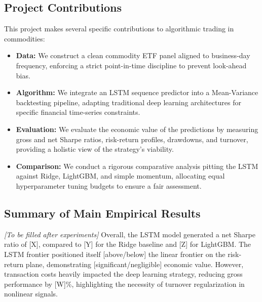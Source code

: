 \documentclass[a4paper,oneside]{scrbook}
\begin{document}
\subsection{Project Contributions}
This project makes several specific contributions to algorithmic trading in commodities:
\begin{itemize}
    \item \textbf{Data:} We construct a clean commodity ETF panel aligned to business-day frequency, enforcing a strict point-in-time discipline to prevent look-ahead bias.
    \item \textbf{Algorithm:} We integrate an LSTM sequence predictor into a Mean-Variance backtesting pipeline, adapting traditional deep learning architectures for specific financial time-series constraints.
    \item \textbf{Evaluation:} We evaluate the economic value of the predictions by measuring gross and net Sharpe ratios, risk-return profiles, drawdowns, and turnover, providing a holistic view of the strategy's viability.
    \item \textbf{Comparison:} We conduct a rigorous comparative analysis pitting the LSTM against Ridge, LightGBM, and simple momentum, allocating equal hyperparameter tuning budgets to ensure a fair assessment.
\end{itemize}

\subsection{Summary of Main Empirical Results}
\textit{[To be filled after experiments]} 
Overall, the LSTM model generated a net Sharpe ratio of [X], compared to [Y] for the Ridge baseline and [Z] for LightGBM. The LSTM frontier positioned itself [above/below] the linear frontier on the risk-return plane, demonstrating [significant/negligible] economic value. However, transaction costs heavily impacted the deep learning strategy, reducing gross performance by [W]\%, highlighting the necessity of turnover regularization in nonlinear signals.
\end{document}
